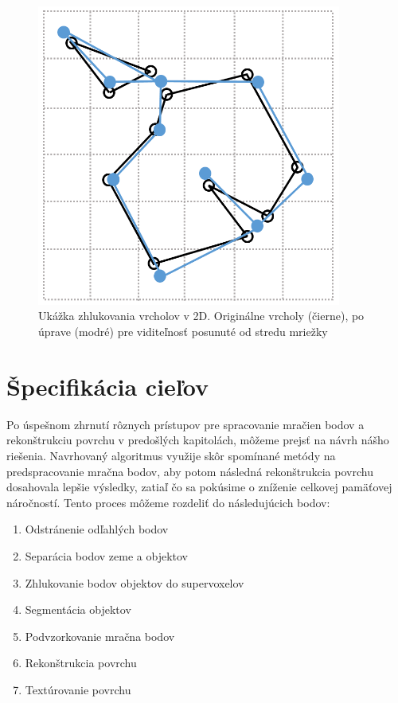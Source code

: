 \newpage\vfill
\begin{figure}[ht]
  \centering
  \includegraphics[width=10cm]{img/vertex_clustering.png}
  \caption{Ukážka zhlukovania vrcholov v 2D. Originálne vrcholy (čierne), po úprave (modré) pre viditeľnosť posunuté od stredu mriežky} 
  \label{fig:verte_cluster}
\end{figure} 
\vfill\clearpage

\section{Špecifikácia cieľov}
\noindent Po úspešnom zhrnutí rôznych prístupov pre spracovanie mračien bodov a rekonštrukciu  povrchu v predošlých kapitolách, môžeme prejsť na návrh nášho riešenia. Navrhovaný algoritmus využije skôr spomínané metódy na predspracovanie mračna bodov, aby potom následná rekonštrukcia povrchu dosahovala lepšie výsledky, zatiaľ čo sa pokúsime o zníženie celkovej pamäťovej náročností. Tento proces môžeme rozdeliť do následujúcich bodov:
\begin{enumerate}
    \item Odstránenie odľahlých bodov
    \item Separácia bodov zeme a objektov
    \item Zhlukovanie bodov objektov do supervoxelov
    \item Segmentácia objektov
    \item Podvzorkovanie mračna bodov
    \item Rekonštrukcia povrchu
    \item Textúrovanie povrchu
\end{enumerate}

